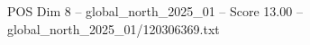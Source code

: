 \begin{textsample}{POS Dim 8 – global\_north\_2025\_01 – Score 13.00 – global\_north\_2025\_01/120306369.txt}
\end{textsample}

